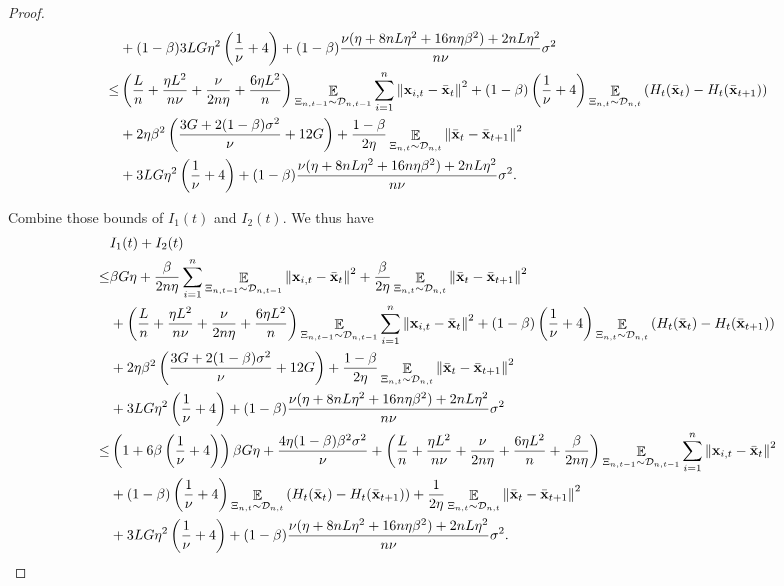 \documentclass{article}
\begin{document}
\begin{proof}
\begin{align}
& + (1-\beta)3LG\eta^2 \left(  \frac{1}{\nu} + 4  \right)  + (1-\beta)\frac{\nu(\eta + 8nL\eta^2 + 16n\eta\beta^2) + 2nL\eta^2}{n\nu} \sigma^2 \\ \nonumber
\le &  \left(  \frac{L}{n} + \frac{\eta L^2}{n\nu} + \frac{\nu}{2n\eta} + \frac{6\eta L^2}{n}  \right)\mathop{\mathbb{E}}_{ \Xi_{n,t-1} \sim \mathcal{D}_{n,t-1} }\sum_{i=1}^n\left\lVert{\bf x}_{i,t} - \bar{{\bf x}}_t \right\rVert^2  + (1-\beta)\left( \frac{1}{\nu} + 4 \right)\mathop{\mathbb{E}}_{ \Xi_{n,t} \sim \mathcal{D}_{n,t} } \left( H_t(\bar{{\bf x}}_t) - H_t(\bar{{\bf x}}_{t+1}) \right)\\ \nonumber 
&+  2\eta\beta^2\left( \frac{3G + 2(1-\beta)\sigma^2}{\nu} + 12G \right) +  \frac{1-\beta}{2\eta} \mathop{\mathbb{E}}_{ \Xi_{n,t} \sim \mathcal{D}_{n,t} }\left\lVert \bar{{\bf x}}_t - \bar{{\bf x}}_{t+1}\right\rVert^2 \\ \nonumber 
& + 3LG\eta^2 \left(  \frac{1}{\nu} + 4  \right)  + (1-\beta)\frac{\nu(\eta + 8nL\eta^2 + 16n\eta\beta^2) + 2nL\eta^2}{n\nu} \sigma^2.
\end{align}





Combine those bounds of $I_1(t)$ and $I_2(t)$. We thus have
\begin{align}
\nonumber
& I_1(t) + I_2(t) \\ \nonumber 
\le & \beta G \eta + \frac{\beta}{2n\eta }\sum_{i=1}^n \mathop{\mathbb{E}}_{ \Xi_{n,t-1} \sim \mathcal{D}_{n,t-1} }\left\lVert{\bf x}_{i,t} - \bar{{\bf x}}_t\right\rVert^2 + \frac{\beta }{2\eta } \mathop{\mathbb{E}}_{ \Xi_{n,t} \sim \mathcal{D}_{n,t} }\left\lVert\bar{{\bf x}}_t - \bar{{\bf x}}_{t+1}\right\rVert^2 \\ \nonumber
& +  \left(  \frac{L}{n} + \frac{\eta L^2}{n\nu} + \frac{\nu}{2n\eta} + \frac{6\eta L^2}{n}  \right)\mathop{\mathbb{E}}_{ \Xi_{n,t-1} \sim \mathcal{D}_{n,t-1} }\sum_{i=1}^n\left\lVert{\bf x}_{i,t} - \bar{{\bf x}}_t \right\rVert^2 + (1-\beta)\left( \frac{1}{\nu} + 4 \right)\mathop{\mathbb{E}}_{ \Xi_{n,t} \sim \mathcal{D}_{n,t} } \left( H_t(\bar{{\bf x}}_t) - H_t(\bar{{\bf x}}_{t+1}) \right)\\ \nonumber 
&+ 2\eta\beta^2\left( \frac{3G + 2(1-\beta)\sigma^2}{\nu} + 12G \right) +  \frac{1-\beta}{2\eta} \mathop{\mathbb{E}}_{ \Xi_{n,t} \sim \mathcal{D}_{n,t} }\left\lVert \bar{{\bf x}}_t - \bar{{\bf x}}_{t+1}\right\rVert^2 \\ \nonumber
& + 3LG\eta^2\left(  \frac{1}{\nu} + 4  \right) + (1-\beta)\frac{\nu(\eta + 8nL\eta^2 + 16n\eta\beta^2) + 2nL\eta^2}{n\nu} \sigma^2\\ \nonumber
\le & \left( 1 + 6\beta\left( \frac{1}{\nu}+4 \right) \right)\beta G \eta + \frac{4\eta (1-\beta)\beta^2 \sigma^2}{\nu} + \left(  \frac{L}{n} + \frac{\eta L^2}{n\nu} + \frac{\nu}{2n\eta} + \frac{6\eta L^2}{n}  + \frac{\beta}{2n\eta}  \right)\mathop{\mathbb{E}}_{ \Xi_{n,t-1} \sim \mathcal{D}_{n,t-1} }\sum_{i=1}^n\left\lVert{\bf x}_{i,t} - \bar{{\bf x}}_t \right\rVert^2 \\ \nonumber 
&+ (1-\beta)\left( \frac{1}{\nu} + 4 \right)\mathop{\mathbb{E}}_{ \Xi_{n,t} \sim \mathcal{D}_{n,t} } \left( H_t(\bar{{\bf x}}_t) - H_t(\bar{{\bf x}}_{t+1}) \right) + \frac{1}{2\eta}\mathop{\mathbb{E}}_{ \Xi_{n,t} \sim \mathcal{D}_{n,t} }\left\lVert \bar{{\bf x}}_t - \bar{{\bf x}}_{t+1}\right\rVert^2 \\ \nonumber 
& + 3LG\eta^2\left(  \frac{1}{\nu} + 4  \right) + (1-\beta)\frac{\nu(\eta + 8nL\eta^2 + 16n\eta\beta^2) + 2nL\eta^2}{n\nu} \sigma^2.
\end{align}


\end{proof}
\end{document}
